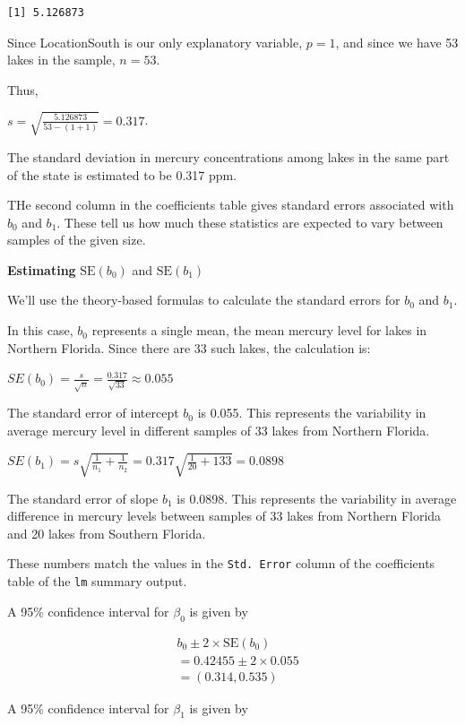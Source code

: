 \documentclass[
  letterpaper,
  DIV=11,
  numbers=noendperiod]{scrreprt}
\begin{document}
\begin{verbatim}
[1] 5.126873
\end{verbatim}

Since LocationSouth is our only explanatory variable, \(p=1\), and since
we have 53 lakes in the sample, \(n=53\).

Thus,

\(s =\sqrt{\frac{5.126873}{53-(1+1)}} = 0.317\).

The standard deviation in mercury concentrations among lakes in the same
part of the state is estimated to be 0.317 ppm.

THe second column in the coefficients table gives standard errors
associated with \(b_0\) and \(b_1\). These tell us how much these
statistics are expected to vary between samples of the given size.

\textbf{Estimating} \(\text{SE}(b_0)\) and \(\text{SE}(b_1)\)

We'll use the theory-based formulas to calculate the standard errors for
\(b_0\) and \(b_1\).

In this case, \(b_0\) represents a single mean, the mean mercury level
for lakes in Northern Florida. Since there are 33 such lakes, the
calculation is:

\(SE(b_0)=\frac{s}{\sqrt{n}} = \frac{0.317}{\sqrt{33}} \approx 0.055\)

The standard error of intercept \(b_0\) is 0.055. This represents the
variability in average mercury level in different samples of 33 lakes
from Northern Florida.

\(SE(b_1)=s\sqrt{\frac{1}{n_1}+\frac{1}{n_2}} = 0.317\sqrt{\frac{1}{20}+{1}{33}} = 0.0898\)

The standard error of slope \(b_1\) is 0.0898. This represents the
variability in average difference in mercury levels between samples of
33 lakes from Northern Florida and 20 lakes from Southern Florida.

These numbers match the values in the \texttt{Std.\ Error} column of the
coefficients table of the \texttt{lm} summary output.

A 95\% confidence interval for \(\beta_0\) is given by

\[
\begin{aligned}
& b_0 \pm 2\times\text{SE}(b_0) \\
& = 0.42455 \pm 2\times{0.055} \\
& = (0.314, 0.535)
\end{aligned}
\]

A 95\% confidence interval for \(\beta_1\) is given by
\end{document}
